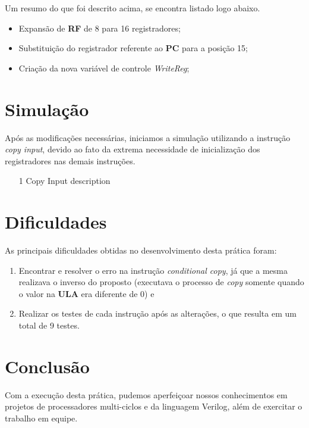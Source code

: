 \documentclass[12pt, a4paper]{article}
\begin{document}
    \vspace{\baselineskip}
    
    \par Um resumo do que foi descrito acima, se encontra listado logo abaixo.
    
    \begin{itemize}
		\item Expansão de \textbf{RF} de 8 para 16 registradores;

        \item Substituição do registrador referente ao \textbf{PC} para a posição 15;

        \item Criação da nova variável de controle \textit{WriteReg};
    \end{itemize}

    \section{Simulação}
    
    \par Após as modificações necessárias, iniciamos a simulação utilizando a instrução \textit{copy input}, devido ao fato da extrema necessidade de inicialização dos registradores nas demais instruções.
    
	\begin{itemize}
		\item[1 Copy Input] description
	\end{itemize}
	
	\section{Dificuldades}
	
	\par As principais dificuldades obtidas no desenvolvimento desta prática foram:
	
	\begin{enumerate}
		\item Encontrar e resolver o erro na instrução \textit{conditional copy}, já que a mesma realizava o inverso do proposto (executava o processo de \textit{copy} somente quando o valor na \textbf{ULA} era diferente de 0) e

        \item Realizar os testes de cada instrução após as alterações, o que resulta em um total de 9 testes.
	\end{enumerate}

	\section{Conclusão}
	
	\par Com a execução desta prática, pudemos aperfeiçoar nossos conhecimentos em projetos de processadores multi-ciclos e da linguagem Verilog, além de exercitar o trabalho em equipe.
\end{document}
